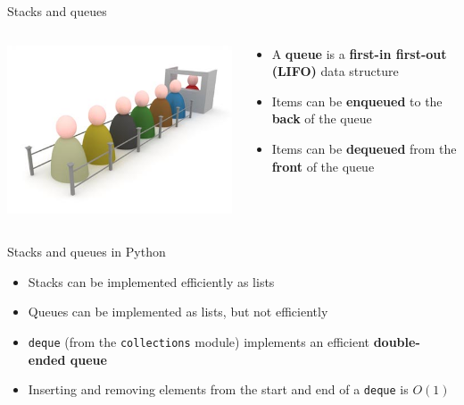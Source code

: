 \begin{frame}{Stacks and queues}
\begin{columns}
\begin{column}{0.3\textwidth}
			\includegraphics[width=\textwidth]{queue}
		\end{column}
		\begin{column}{0.68\textwidth}
			\begin{itemize}
				\item A \textbf{queue} is a \textbf{first-in first-out (LIFO)} data structure
				\pause\item Items can be \textbf{enqueued} to the \textbf{back} of the queue
				\pause\item Items can be \textbf{dequeued} from the \textbf{front} of the queue
			\end{itemize}
		\end{column}
	\end{columns}
\end{frame}

\begin{frame}{Stacks and queues in Python}
	\begin{itemize}
		\pause\item Stacks can be implemented efficiently as lists
		\pause\item Queues can be implemented as lists, but not efficiently
		\pause\item \lstinline{deque} (from the \lstinline{collections} module) implements an efficient
			\textbf{double-ended queue}
		\pause\item Inserting and removing elements from the start and end of a \lstinline{deque} is $O(1)$
	\end{itemize}
\end{frame}

